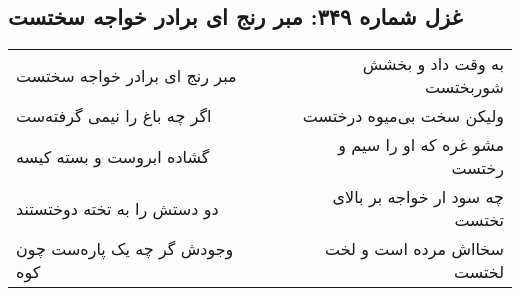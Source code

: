 \begin{center}
\section*{غزل شماره ۳۴۹: مبر رنج ای برادر خواجه سختست}
\label{sec:0349}
\begin{longtable}{l p{0.5cm} r}
مبر رنج ای برادر خواجه سختست
&&
به وقت داد و بخشش شوربختست
\\
اگر چه باغ را نیمی گرفته‌ست
&&
ولیکن سخت بی‌میوه درختست
\\
گشاده ابروست و بسته کیسه
&&
مشو غره که او را سیم و رختست
\\
دو دستش را به تخته دوختستند
&&
چه سود ار خواجه بر بالای تختست
\\
وجودش گر چه یک پاره‌ست چون کوه
&&
سخااش مرده است و لخت لختست
\\
\end{longtable}
\end{center}
